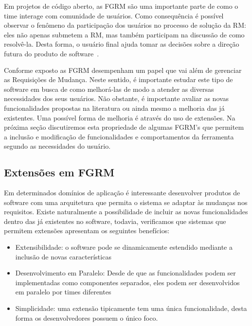 Em projetos de código aberto, as FGRM são uma importante parte de como o time interage com
comunidade de usuários. Como consequência é possível observar o fenômeno da participação
dos usuários no processo de solução da RM: eles não apenas submetem a RM, mas também
participam na discussão de como resolvê-la. Desta forma, o usuário final ajuda tomar as decisões
sobre a direção futura do produto de software~\cite{breu2010information}.

Conforme exposto as FGRM desempenham um papel que vai além de gerenciar as Requisições de Mudança.
Neste sentido, é importante estudar este tipo de software em busca de como melhorá-las de modo a
atender as diversas necessidades dos seus usuários. Não obstante, é
importante avaliar as novas funcionalidades propostas na literatura ou ainda mesmo a melhoria das já
existentes. Uma possível forma de melhoria é através do uso de extensões. Na próxima seção
discutiremos esta propriedade de algumas FGRM's que permitem a inclusão e modificação de
funcionalidades e comportamentos da ferramenta segundo as necessidades do usuário. 

\subsection{Extensões em FGRM}
\label{subsec:extensoes_fgrm}

Em determinados domínios de aplicação é interessante desenvolver produtos de software com uma
arquitetura que permita o sistema se adaptar às mudanças nos requisitos. Existe naturalmente a
possibilidade de incluir as novas funcionalidades dentro das já existentes no software, todavia,
verificamos que sistemas que permitem extensões apresentam os seguintes benefícios:

\begin{itemize}
	\item Extensibilidade: o software pode se dinamicamente estendido mediante a inclusão de novas características
	\item Desenvolvimento em Paralelo: Desde de que as funcionalidades podem ser implementadas como
		componentes separados, eles podem ser desenvolvidos em paralelo por times diferentes
    \item Simplicidade: uma  extensão tipicamente tem uma única funcionalidade, desta forma os
		desenvolvedores possuem o único foco.
\end{itemize}

